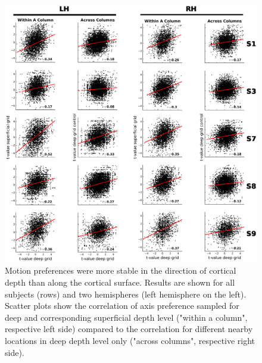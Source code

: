 \begin{figure}[htbp!]
\centering
\includegraphics[width=\textwidth]{figures/chapter_03_SI/figS9.eps}
\caption{Motion preferences were more stable in the direction of cortical depth than along the cortical surface. Results are shown for all subjects (rows) and two hemispheres (left hemisphere on the left). Scatter plots show the correlation of axis preference sampled for deep and corresponding superficial depth level ("within a column", respective left side) compared to the correlation for different nearby locations in deep depth level only ("across columns", respective right side).}
\label{fig:fig4F_supp}
\end{figure}

